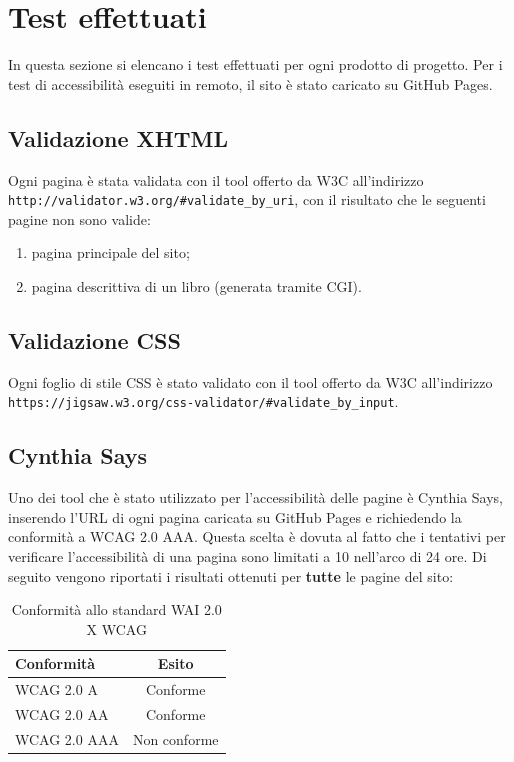 \section{Test effettuati} %
In questa sezione si elencano i test effettuati per ogni prodotto di progetto.
Per i test di accessibilità eseguiti in remoto, il sito è stato caricato su
GitHub Pages.

\subsection{Validazione XHTML}
Ogni pagina è stata validata con il tool offerto da W3C all'indirizzo
\texttt{http://validator.w3.org/\#validate\_by\_uri}, con il risultato che
le seguenti pagine non sono valide:
\begin{enumerate}
\item pagina principale del sito;
\item pagina descrittiva di un libro (generata tramite CGI).
\end{enumerate}

\subsection{Validazione CSS}
Ogni foglio di stile CSS è stato validato con il tool offerto da W3C
all'indirizzo
\texttt{https://jigsaw.w3.org/css-validator/\#validate\_by\_input}.

\subsection{Cynthia Says}
Uno dei tool che è stato utilizzato per l'accessibilità delle pagine è Cynthia
Says, inserendo l'URL di ogni pagina caricata su GitHub Pages e richiedendo la
conformità a WCAG 2.0 AAA. Questa scelta è dovuta al fatto che i tentativi per
verificare l'accessibilità di una pagina sono limitati a 10 nell'arco di 24
ore.
Di seguito vengono riportati i risultati ottenuti per \textbf{tutte} le pagine
del sito:

\begin{table}[h!]
\begin{center}
\begin{tabular}{ | l | c | }
  \hline
  Conformità & Esito \\
  \hline
  WCAG 2.0 A & Conforme \\
  \hline
  WCAG 2.0 AA & Conforme \\
  \hline
  WCAG 2.0 AAA & Non conforme \\
  \hline
\end{tabular}
\caption{Conformità allo standard WAI 2.0 X WCAG}
\end{center}
\end{table}

